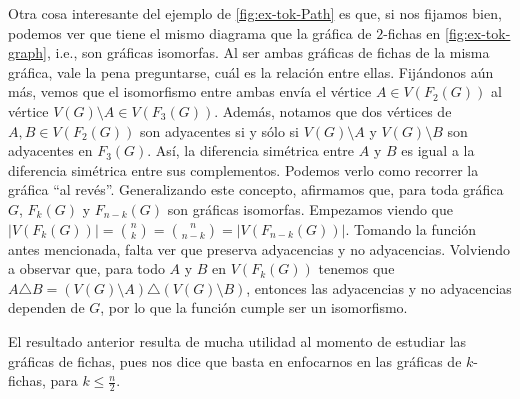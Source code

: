 \newpage

Otra cosa interesante del ejemplo de \cref{fig:ex-tok-Path} es que, si nos
fijamos bien, podemos ver que tiene el mismo diagrama que la gr\'afica de
$2$-fichas en \cref{fig:ex-tok-graph}, i.e., son gr\'aficas isomorfas. Al ser
ambas gr\'aficas de fichas de la misma gr\'afica, vale la pena preguntarse,
cu\'al es la relaci\'on entre ellas. Fij\'andonos a\'un m\'as, vemos que el
isomorfismo entre ambas env\'ia el v\'ertice $A \in V(F_2(G))$ al v\'ertice
$V(G) \setminus A \in V(F_3(G))$. Adem\'as, notamos que dos v\'ertices de $ A,B
\in V(F_2(G))$ son adyacentes si y s\'olo si $V(G) \setminus A$ y $V(G)
\setminus B$ son adyacentes en $F_3(G)$. As\'i, la diferencia sim\'etrica entre
$A$ y $B$ es igual a la diferencia sim\'etrica entre sus complementos. Podemos
verlo como recorrer la gr\'afica ``al rev\'es''. Generalizando este concepto,
afirmamos que, para toda gr\'afica $G$, $F_k(G)$ y $F_{n-k}(G)$ son gr\'aficas
isomorfas. Empezamos viendo que $|V(F_k(G))| =\binom{n}{k}= \binom{n}{n-k}=
|V(F_{n-k}(G))|$. Tomando la funci\'on antes mencionada, falta ver que preserva
adyacencias y no adyacencias. Volviendo a observar que, para todo $A$ y $B$ en
$V(F_k(G))$ tenemos que $A \triangle B = (V(G)\setminus A) \triangle
(V(G)\setminus B)$, entonces las adyacencias y no adyacencias dependen de $G$,
por lo que la funci\'on cumple ser un isomorfismo. 

El resultado anterior resulta de mucha utilidad al momento de estudiar las
gr\'aficas de fichas, pues nos dice que basta en enfocarnos en las gr\'aficas de
$k$-fichas, para $k \leq \frac{n}{2}$.

